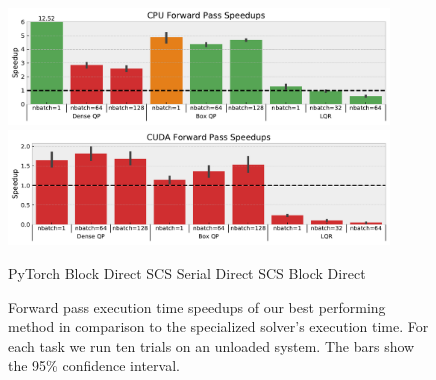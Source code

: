 \begin{figure}[!h]
  \centering
  \includegraphics[width=0.9\textwidth]{prof/CPU-forward-speedups.pdf}
  \includegraphics[width=0.9\textwidth]{prof/CUDA-forward-speedups.pdf}

   PyTorch Block Direct \enskip
   SCS Serial Direct \enskip
   SCS Block Direct

  \caption{
    Forward pass execution time speedups of our best
    performing method in comparison to the specialized
    solver's execution time.
    For each task we run ten trials on an unloaded system.
    The bars show the 95\% confidence interval.
  }
  \label{fig:eval:fwd:speedups}
\end{figure}

